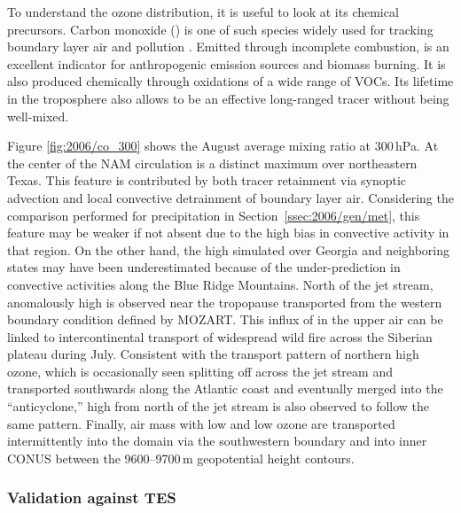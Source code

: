 To understand the ozone distribution, it is useful to look at its chemical precursors. Carbon monoxide () is one of such species widely used for
tracking boundary layer air and pollution \citep[e.g.][]{Pan:2007sw,Weinstock:2007yj,Mcmillan:2010kx}. Emitted through incomplete
combustion,  is an excellent indicator for anthropogenic emission sources and biomass burning. It is also produced chemically through oxidations
of a wide range of VOCs. Its lifetime in the troposphere also allows  to be an effective long-ranged tracer without being well-mixed.

Figure \ref{fig:2006/co_300} shows the August average  mixing ratio at 300\,\unit{hPa}. At the center of the NAM circulation is a distinct 
maximum over northeastern Texas. This feature is contributed by both tracer retainment via synoptic advection and local convective detrainment of boundary layer
air. Considering the comparison performed for precipitation in Section~\ref{ssec:2006/gen/met}, this feature may be weaker if not absent due to the high bias in
convective activity in that region. On the other hand, the high  simulated over Georgia and neighboring states may have been underestimated because
of the under-prediction in convective activities along the Blue Ridge Mountains. North of the jet stream, anomalously high  is observed near the
tropopause transported from the western boundary condition defined by MOZART. This influx of  in the upper air can be linked to intercontinental transport
of widespread wild fire across the Siberian plateau during July.%
Consistent with the transport pattern of northern high ozone, which is occasionally seen splitting off across the jet stream and transported southwards along the
Atlantic coast and eventually merged into the ``anticyclone,'' high  from north of the jet stream is also observed to follow the same pattern.
Finally, air mass with low  and low ozone are transported intermittently into the domain via the southwestern boundary and into inner CONUS
between the 9600--9700\,\unit{m} geopotential height contours.

\subsubsection{Validation against TES}

